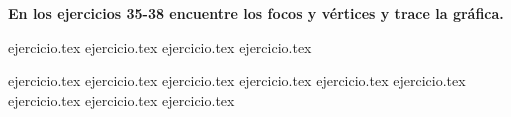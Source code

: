 \vspace{0.3cm}
\noindent\textbf{En los ejercicios 35-38 encuentre los focos y vértices y trace la gráfica.}
\begin{enumerate}
    \setcounter{enumi}{34}
    {ejercicio.tex}
{ejercicio.tex}
{ejercicio.tex}
{ejercicio.tex}
\end{enumerate}

\vspace{0.3cm}
\begin{enumerate}
    \setcounter{enumi}{38}
    {ejercicio.tex}
{ejercicio.tex}
{ejercicio.tex}
{ejercicio.tex}
{ejercicio.tex}
{ejercicio.tex}
{ejercicio.tex}
{ejercicio.tex}
{ejercicio.tex}
\end{enumerate}

